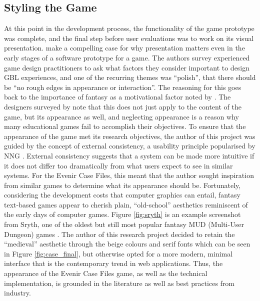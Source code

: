 \documentclass{l4proj}
\begin{document}
\subsection{Styling the Game}

At this point in the development process, the functionality of the game prototype was complete, and the final step before user evaluations was to work on its visual presentation. \citet{isbister2010designing} make a compelling case for why presentation matters even in the early stages of a software prototype for a game. The authors survey experienced game design practitioners to ask what factors they consider important to design GBL experiences, and one of the recurring themes was “polish”, that there should be “no rough edges in appearance or interaction”. The reasoning for this goes back to the importance of fantasy as a motivational factor noted by \citet{malone1980makes}. The designers surveyed by \citet{isbister2010designing} note that this does not just apply to the content of the game, but its appearance as well, and neglecting appearance is a reason why many educational games fail to accomplish their objectives. To ensure that the appearance of the game met its research objectives, the author of this project was guided by the concept of external consistency, a usability principle popularised by NNG \citep{nng2021consistency}. External consistency suggests that a system can be made more intuitive if it does not differ too dramatically from what users expect to see in similar systems. For the Evenir Case Files, this meant that the author sought inspiration from similar games to determine what its appearance should be. Fortunately, considering the development costs that computer graphics can entail, fantasy text-based games appear to cherish plain, “old-school” aesthetics reminiscent of the early days of computer games. Figure \ref{fig:sryth} is an example screenshot from Sryth, one of the oldest but still most popular fantasy MUD (Multi-User Dungeon) games \citep{sryth}. The author of this research project decided to retain the “medieval” aesthetic through the beige colours and serif fonts which can be seen in Figure \ref{fig:case_final}, but otherwise opted for a more modern, minimal interface that is the contemporary trend in web applications. Thus, the appearance of the Evenir Case Files game, as well as the technical implementation, is grounded in the literature as well as best practices from industry.       
\end{document}

